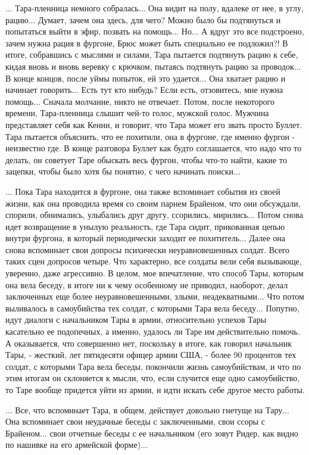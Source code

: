 ... Тара-пленница немного собралась... Она видит на полу, вдалеке от нее, в
углу, рацию... Думает, зачем она здесь, для чего? Можно было бы подтянуться и
попытаться выйти в эфир, позвать на помощь... Но... А вдруг это все подстроено,
зачем нужна рация в фургоне, Брюс может быть специально ее подложил?! В итоге,
собравшись с мыслями и силами, Тара пытается подтянуть рацию к себе, кидая
вновь и вновь веревку с крючком, пытаясь подтянуть рацию за проводок... В конце
концов, после уймы попыток, ей это удается... Она хватает рацию и начинает
говорить... Есть тут кто нибудь? Если есть, отзовитесь, мне нужна помощь...
Сначала молчание, никто не отвечает.  Потом, после некоторого времени,
Тара-пленница слышит чей-то голос, мужской голос. Мужчина представляет себя как
Кенни, и говорит, что Тара может его звать просто Буллет. Тара пытается
объяснить, что ее похитили, она в фургоне, где именно фургон - неизвестно где.
В конце разговора Буллет как будто соглашается, что надо что то делать, он
советует Таре обыскать весь фургон, чтобы что-то найти, какие то зацепки, чтобы
было хотя бы понятно, с чего начинать поиски...

... Пока Тара находится в фургоне, она также вспоминает события из своей жизни,
как она проводила время со своим парнем Брайеном, что они обсуждали, спорили,
обнимались, улыбались друг другу, ссорились, мирились... Потом снова идет
возвращение в унылую реальность, где Тара сидит, прикованная цепью внутри
фургона, в который периодически заходит ее похититель... Далее она снова
вспоминает свои допросы психически неуравновешенных солдат. Всего таких сцен
допросов четыре.  Что характерно, все солдаты вели себя вызывающе, уверенно,
даже агрессивно. В целом, мое впечатление, что способ Тары, которым она вела
беседу, в итоге ни к чему особенному не приводил, наоборот, делал заключенных
еще более неуравновешенными, злыми, неадекватными...  Что потом выливалось в
самоубийства тех солдат, с которыми Тара вела беседу...  Попутно, идут диалоги
с начальником Тары в армии, относительно успехов Тары касательно ее подопечных,
а именно, удалось ли Таре им действительно помочь. А оказывается, что
совершенно нет, поскольку в итоге, как говорил начальник Тары, - жесткий, лет
пятидесяти офицер армии США, - более 90 процентов тех солдат, с которыми Тара
вела беседы, покончили жизнь самоубийствам, и что по этим итогам он склоняется
к мысли, что, если случится еще одно самоубийство, то Таре вообще придется уйти
из армии, и идти искать себе другое место работы.

... Все, что вспоминает Тара, в общем, действует довольно гнетуще на Тару...
Она вспоминает свои неудачные беседы с заключенными, свои ссоры с Брайеном...
свои отчетные беседы с ее начальником (его зовут Ридер, как видно по нашивке на
его армейской форме)...

